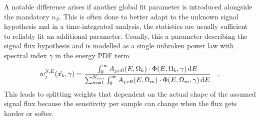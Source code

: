 A notable difference arises if another global fit parameter is introduced alongside the mandatory $n_S$.
This is often done to better adapt to the unknown signal hypothesis and in a time-integrated analysis, the statistics are usually sufficient to reliably fit an additional parameter.
Usually, this a parameter describing the signal flux hypothesis and is modelled as a single unbroken power law with spectral index $\gamma$ in the energy PDF term
\begin{equation}
  w_j^{S,E}(\vec{x}_k, \gamma)
  = \frac
      {
        \int_0^\infty A_{j,\text{eff}}(E,\Omega_k)\cdot
          \Phi(E, \Omega_k, \gamma)\,\mathrm{d}E
      }
      {
        \sum_{m=1}^{N_\text{srcs}}
        \int_0^\infty A_{j,\text{eff}}(E,\Omega_m)\cdot
          \Phi(E, \Omega_m, \gamma)\,\mathrm{d}E
      }
  \quad\text{.}
\end{equation}
This leads to splitting weights that dependent on the actual shape of the assumed signal flux because the sensitivity per sample can change when the flux gets harder or softer.

